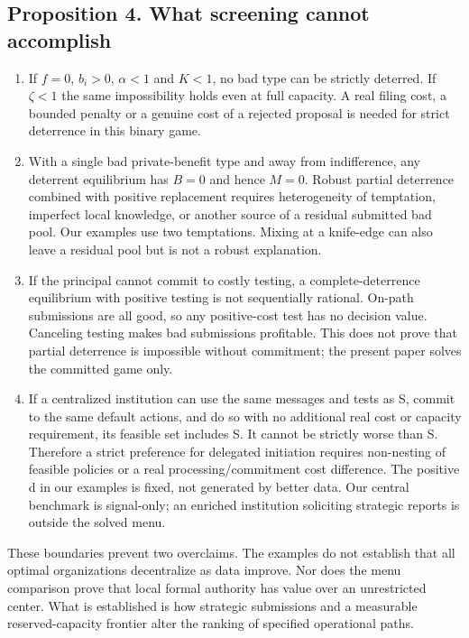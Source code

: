 \documentclass[
  11pt,
]{article}
\begin{document}
\subsection{Proposition 4. What screening cannot
accomplish}\label{proposition-4.-what-screening-cannot-accomplish}

\begin{enumerate}
\def\labelenumi{(\alph{enumi})}
\item
  If \(f=0\), \(b_i>0\), \(\alpha<1\) and \(K<1\), no bad type can be
  strictly deterred. If \(\zeta<1\) the same impossibility holds even at
  full capacity. A real filing cost, a bounded penalty or a genuine cost
  of a rejected proposal is needed for strict deterrence in this binary
  game.
\item
  With a single bad private-benefit type and away from indifference, any
  deterrent equilibrium has \(B=0\) and hence \(M=0\). Robust partial
  deterrence combined with positive replacement requires heterogeneity
  of temptation, imperfect local knowledge, or another source of a
  residual submitted bad pool. Our examples use two temptations. Mixing
  at a knife-edge can also leave a residual pool but is not a robust
  explanation.
\item
  If the principal cannot commit to costly testing, a
  complete-deterrence equilibrium with positive testing is not
  sequentially rational. On-path submissions are all good, so any
  positive-cost test has no decision value. Canceling testing makes bad
  submissions profitable. This does not prove that partial deterrence is
  impossible without commitment; the present paper solves the committed
  game only.
\item
  If a centralized institution can use the same messages and tests as S,
  commit to the same default actions, and do so with no additional real
  cost or capacity requirement, its feasible set includes S. It cannot
  be strictly worse than S. Therefore a strict preference for delegated
  initiation requires non-nesting of feasible policies or a real
  processing/commitment cost difference. The positive d in our examples
  is fixed, not generated by better data. Our central benchmark is
  signal-only; an enriched institution soliciting strategic reports is
  outside the solved menu.
\end{enumerate}

These boundaries prevent two overclaims. The examples do not establish
that all optimal organizations decentralize as data improve. Nor does
the menu comparison prove that local formal authority has value over an
unrestricted center. What is established is how strategic submissions
and a measurable reserved-capacity frontier alter the ranking of
specified operational paths.
\end{document}
